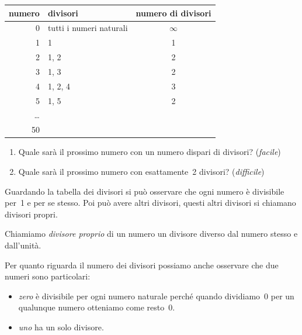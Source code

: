 \begin{table}[h]
\centering
\begin{tabular}{|r|p{6cm}|c|}
\hline
\textsf{\relax 
numero
} & \textsf{\relax 
          divisori 
} & \textsf{\relax 
numero di divisori
}\\
\hline
0 & tutti i numeri naturali & \(\infty\)\\
\hline
1 & 1 & 1\\
\hline
2 & 1, 2 & 2\\
\hline
3 & 1, 3 & 2\\
\hline
4 & 1, 2, 4 & 3\\
\hline
5 & 1, 5 & 2\\
\hline
\dots &  & \\
\hline
50 &  & \\
\hline
\end{tabular}
\end{table}

\begin{enumerate}[noitemsep, label=(\alph*)]
 \item Quale sarà il prossimo numero con un numero dispari 
  di divisori? (\emph{facile})
 \item Quale sarà il prossimo numero con esattamente~2
  divisori? (\emph{difficile})
\end{enumerate}

Guardando la tabella dei divisori si può osservare che ogni numero è 
divisibile per~1 e per se stesso. Poi può avere altri divisori, questi
altri divisori si chiamano divisori propri.

\begin{definizione}{}{}
 Chiamiamo \emph{divisore proprio} di un numero un divisore diverso dal 
 numero stesso e dall'unità.
\end{definizione}

Per quanto riguarda il numero dei divisori possiamo anche osservare che 
due numeri sono particolari:

\begin{itemize} [nosep]
 \item \emph{zero} è divisibile per ogni numero naturale perché quando 
  dividiamo~0 per un qualunque numero otteniamo come resto~0.
 \item \emph{uno} ha un solo divisore.
\end{itemize}

